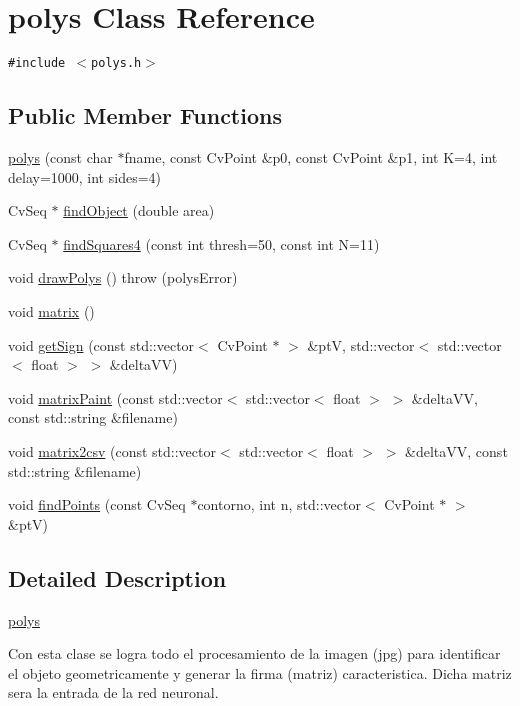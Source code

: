 \hypertarget{classpolys}{
\section{polys Class Reference}
\label{classpolys}
}
{\tt \#include $<$polys.h$>$}

\subsection*{Public Member Functions}
\begin{CompactItemize}
\item 
\hyperlink{classpolys_5bca1e7b11049a71f581d8a42121cddb}{polys} (const char $\ast$fname, const CvPoint \&p0, const CvPoint \&p1, int K=4, int delay=1000, int sides=4)
\item 
CvSeq $\ast$ \hyperlink{classpolys_150df3ed5aaef122960c7050c6ceea11}{findObject} (double area)
\item 
CvSeq $\ast$ \hyperlink{classpolys_a8e9ae3faba2b964f75920f31384f3eb}{findSquares4} (const int thresh=50, const int N=11)
\item 
void \hyperlink{classpolys_ee69339d22923e16be105533518c8c01}{drawPolys} ()  throw (polysError)
\item 
void \hyperlink{classpolys_a858294eddc4fe0f9a6e1292e9687249}{matrix} ()
\item 
void \hyperlink{classpolys_e6a62f459667bbb2ff27dd0b89b07cd6}{getSign} (const std::vector$<$ CvPoint $\ast$ $>$ \&ptV, std::vector$<$ std::vector$<$ float $>$ $>$ \&deltaVV)
\item 
void \hyperlink{classpolys_e0bab6a2070d9c92290bdc84e02d0ebc}{matrixPaint} (const std::vector$<$ std::vector$<$ float $>$ $>$ \&deltaVV, const std::string \&filename)
\item 
void \hyperlink{classpolys_87d1385def6b1b43d713ac19403d5c08}{matrix2csv} (const std::vector$<$ std::vector$<$ float $>$ $>$ \&deltaVV, const std::string \&filename)
\item 
void \hyperlink{classpolys_a47d2d9725c7d2c3686c410d8b536ad7}{findPoints} (const CvSeq $\ast$contorno, int n, std::vector$<$ CvPoint $\ast$ $>$ \&ptV)
\end{CompactItemize}


\subsection{Detailed Description}
\hyperlink{classpolys}{polys}

Con esta clase se logra todo el procesamiento de la imagen (jpg) para identificar el objeto geometricamente y generar la firma (matriz) caracteristica. Dicha matriz sera la entrada de la red neuronal. 

